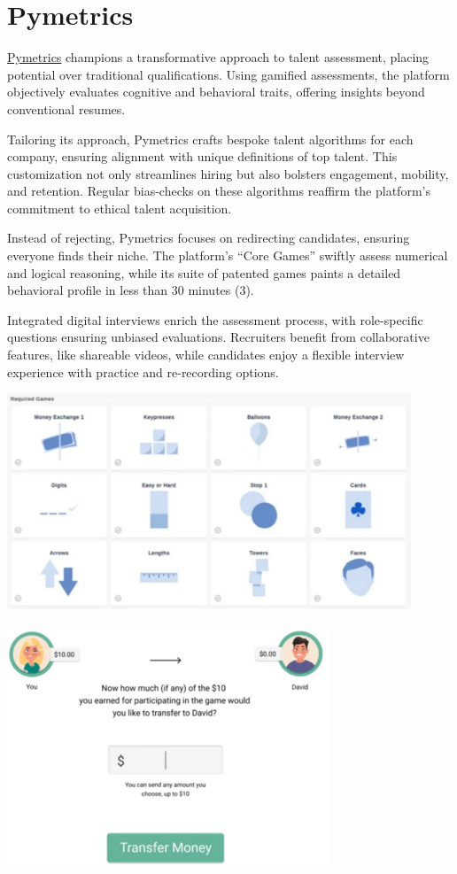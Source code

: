 \documentclass[
]{book}
\begin{document}
\hypertarget{pymetrics}{%
\section{Pymetrics}\label{pymetrics}}

\href{https://www.pymetrics.ai/}{Pymetrics} champions a transformative approach to talent assessment, placing potential over traditional qualifications. Using gamified assessments, the platform objectively evaluates cognitive and behavioral traits, offering insights beyond conventional resumes.

Tailoring its approach, Pymetrics crafts bespoke talent algorithms for each company, ensuring alignment with unique definitions of top talent. This customization not only streamlines hiring but also bolsters engagement, mobility, and retention. Regular bias-checks on these algorithms reaffirm the platform's commitment to ethical talent acquisition.

Instead of rejecting, Pymetrics focuses on redirecting candidates, ensuring everyone finds their niche. The platform's ``Core Games'' swiftly assess numerical and logical reasoning, while its suite of patented games paints a detailed behavioral profile in less than 30 minutes (3).

Integrated digital interviews enrich the assessment process, with role-specific questions ensuring unbiased evaluations. Recruiters benefit from collaborative features, like shareable videos, while candidates enjoy a flexible interview experience with practice and re-recording options.

\includegraphics[width=4.75in,height=\textheight]{pymetrics pic2.png}

\includegraphics[width=3.78125in,height=\textheight]{pymetrics pic1.png}
\end{document}
